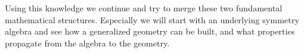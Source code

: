 \documentclass{article}
\begin{document}
Using this knowledge we continue and try to merge these two fundamental mathematical structures. Especially we will start with an underlying symmetry algebra and see how a generalized geometry can be built, and what properties propagate from the algebra to the geometry. 








\end{document}
